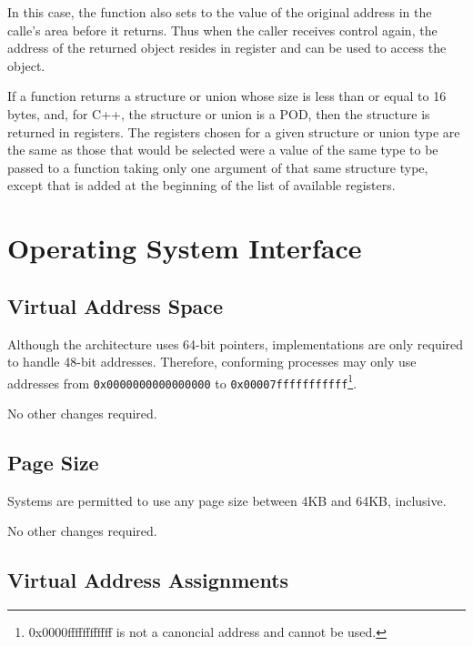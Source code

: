 In this case, the function also sets \RBX to the value of the original
address in the calle's area before it returns.  Thus when the caller
receives control again, the address of the returned object resides in
register \RBX and can be used to access the object.
  
If a function returns a structure or union whose size is less than or
equal to 16 bytes, and, for C++, the structure or union is a POD, then
the structure is returned in registers.  The registers chosen for a
given structure or union type are the same as those that would be
selected were a value of the same type to be passed to a function
taking only one argument of that same structure type, except that \RAX
is added at the beginning of the list of available registers.

\section{Operating System Interface}

\subsection{Virtual Address Space}

Although the \xARCH architecture uses 64-bit pointers, implementations
are only required to handle 48-bit addresses.  Therefore, conforming
processes may only use addresses from \texttt{0x0000000000000000} to
\texttt{0x00007fffffffffff}\footnote{0x0000ffffffffffff is not a
  canoncial address and cannot be used.}.

No other changes required.

\subsection{Page Size}

Systems are permitted to use any page size between 4KB and 64KB,
inclusive.

No other changes required.

\subsection{Virtual Address Assignments}

